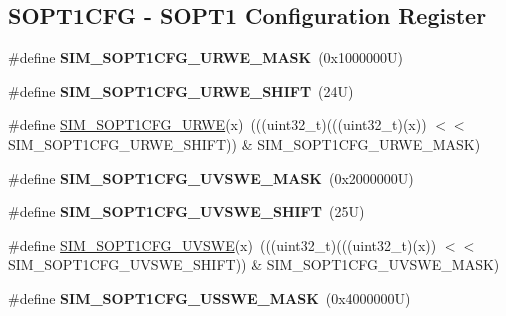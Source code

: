 \subsection*{S\+O\+P\+T1\+C\+FG -\/ S\+O\+P\+T1 Configuration Register}
\begin{DoxyCompactItemize}
\item 
\mbox{\label{group___s_i_m___register___masks_gaa4e1ee8f60c8c15ad553c2dfb82c2039}} 
\#define {\bfseries S\+I\+M\+\_\+\+S\+O\+P\+T1\+C\+F\+G\+\_\+\+U\+R\+W\+E\+\_\+\+M\+A\+SK}~(0x1000000\+U)
\item 
\mbox{\label{group___s_i_m___register___masks_ga07bf2ffc61aacca96748747fa8df7062}} 
\#define {\bfseries S\+I\+M\+\_\+\+S\+O\+P\+T1\+C\+F\+G\+\_\+\+U\+R\+W\+E\+\_\+\+S\+H\+I\+FT}~(24\+U)
\item 
\#define \mbox{\hyperlink{group___s_i_m___register___masks_gab35f1f0507a59aa7b67b63ab7550bbca}{S\+I\+M\+\_\+\+S\+O\+P\+T1\+C\+F\+G\+\_\+\+U\+R\+WE}}(x)~(((uint32\+\_\+t)(((uint32\+\_\+t)(x)) $<$$<$ S\+I\+M\+\_\+\+S\+O\+P\+T1\+C\+F\+G\+\_\+\+U\+R\+W\+E\+\_\+\+S\+H\+I\+FT)) \& S\+I\+M\+\_\+\+S\+O\+P\+T1\+C\+F\+G\+\_\+\+U\+R\+W\+E\+\_\+\+M\+A\+SK)
\item 
\mbox{\label{group___s_i_m___register___masks_ga29e593e134a31bed2dbd3673c51cb330}} 
\#define {\bfseries S\+I\+M\+\_\+\+S\+O\+P\+T1\+C\+F\+G\+\_\+\+U\+V\+S\+W\+E\+\_\+\+M\+A\+SK}~(0x2000000\+U)
\item 
\mbox{\label{group___s_i_m___register___masks_ga74d94a9794e03091f54b76a5c18c58b8}} 
\#define {\bfseries S\+I\+M\+\_\+\+S\+O\+P\+T1\+C\+F\+G\+\_\+\+U\+V\+S\+W\+E\+\_\+\+S\+H\+I\+FT}~(25\+U)
\item 
\#define \mbox{\hyperlink{group___s_i_m___register___masks_ga0889129046535e3511d47d7a806b8644}{S\+I\+M\+\_\+\+S\+O\+P\+T1\+C\+F\+G\+\_\+\+U\+V\+S\+WE}}(x)~(((uint32\+\_\+t)(((uint32\+\_\+t)(x)) $<$$<$ S\+I\+M\+\_\+\+S\+O\+P\+T1\+C\+F\+G\+\_\+\+U\+V\+S\+W\+E\+\_\+\+S\+H\+I\+FT)) \& S\+I\+M\+\_\+\+S\+O\+P\+T1\+C\+F\+G\+\_\+\+U\+V\+S\+W\+E\+\_\+\+M\+A\+SK)
\item 
\mbox{\label{group___s_i_m___register___masks_ga0b7d9fe471d5d689ba3feb001cf69b60}} 
\#define {\bfseries S\+I\+M\+\_\+\+S\+O\+P\+T1\+C\+F\+G\+\_\+\+U\+S\+S\+W\+E\+\_\+\+M\+A\+SK}~(0x4000000\+U)

\end{DoxyCompactItemize}
